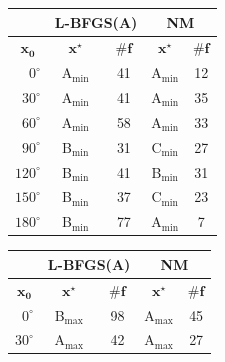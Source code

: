 \begin{minipage}{\textwidth}
	\begin{minipage}[b]{0.4\textwidth}
		\bgroup
		\setlength\tabcolsep{3mm}
		\def\arraystretch{1.5}%
		\begin{tabular}{|r|cc|cc|}
			\hline
			& \multicolumn{2}{c|}{L-BFGS(A)} & \multicolumn{2}{c|}{NM} \\ \hline
			\multicolumn{1}{|c|}{$\mathbf{x_0}$}& $\mathbf{x^\star}$ & $ \boldsymbol{\#f} $ & $\mathbf{x^\star}$ & $ \boldsymbol{\#f} $ \\ \hline
			$ 0^\circ $ 		&      A$_{\min}$           &     41   &    A$_{\min}$   &  12 \\ 
			$ 30^\circ $ 		&      A$_{\min}$     		&     41   &    A$_{\min}$   &  35 \\ 
			$ 60^\circ $ 		&      A$_{\min}$     		&     58   &    A$_{\min}$   &  33 \\ 
			$ 90^\circ $ 		&      B$_{\min}$     		&     31   &    C$_{\min}$   &  27 \\ 
			$ 120^\circ $ 		&      B$_{\min}$     		&     41   &    B$_{\min}$   &  31 \\ 
			$ 150^\circ $ 		&      B$_{\min}$     		&     37   &    C$_{\min}$   &  23 \\
			$ 180^\circ $ 		&      B$_{\min}$     		&     77   &    A$_{\min}$   &  7 \\ \hline
		\end{tabular}
		\vspace{2mm}
		\label{tab:elip1min}
		\egroup
	\end{minipage}%
	\begin{minipage}[b]{0.15\textwidth}
		\centering
		\hspace{1mm}
	\end{minipage}%
	\begin{minipage}[b]{0.4\textwidth}
		\bgroup
		\setlength\tabcolsep{3mm}
		\def\arraystretch{1.5}%
		\begin{tabular}{|r|cc|cc|}
			\hline
			& \multicolumn{2}{c|}{L-BFGS(A)} & \multicolumn{2}{c|}{NM} \\ \hline
			\multicolumn{1}{|c|}{$\mathbf{x_0}$}& $\mathbf{x^\star}$ & $ \boldsymbol{\#f} $ & $\mathbf{x^\star}$ & $ \boldsymbol{\#f} $ \\ \hline
			$ 0^\circ $ 		&      B$_{\max}$           &     98   &    A$_{\max}$   &  45 \\ 
			$ 30^\circ $ 		&      A$_{\max}$     		&     42   &    A$_{\max}$   &  27 \\ 

\end{tabular}
\end{minipage}
\end{minipage}

